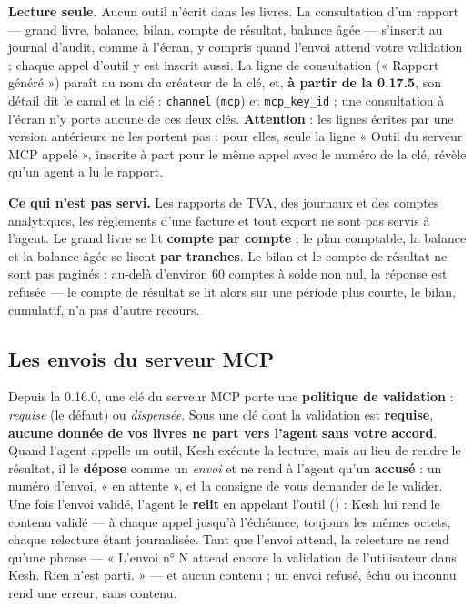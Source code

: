 \documentclass[a4paper,11pt,oneside]{article}
\begin{document}
\textbf{Lecture seule.} Aucun outil n'écrit dans les livres. La consultation d'un rapport --- grand livre, balance, bilan, compte de résultat, balance âgée --- s'inscrit au journal d'audit, comme à l'écran, y compris quand l'envoi attend votre validation ; chaque appel d'outil y est inscrit aussi. La ligne de consultation (« Rapport généré ») paraît au nom du créateur de la clé, et, \textbf{à partir de la 0.17.5}, son détail dit le canal et la clé : \texttt{channel} (\texttt{mcp}) et \texttt{mcp\_key\_id} ; une consultation à l'écran n'y porte aucune de ces deux clés. \textbf{Attention} : les lignes écrites par une version antérieure ne les portent pas : pour elles, seule la ligne « Outil du serveur MCP appelé », inscrite à part pour le même appel avec le numéro de la clé, révèle qu'un agent a lu le rapport.

\textbf{Ce qui n'est pas servi.} Les rapports de TVA, des journaux et des comptes analytiques, les règlements d'une facture et tout export ne sont pas servis à l'agent. Le grand livre se lit \textbf{compte par compte} ; le plan comptable, la balance et la balance âgée se lisent \textbf{par tranches}. Le bilan et le compte de résultat ne sont pas paginés : au-delà d'environ 60 comptes à solde non nul, la réponse est refusée --- le compte de résultat se lit alors sur une période plus courte, le bilan, cumulatif, n'a pas d'autre recours.

\subsection{Les envois du serveur MCP}\label{sec:mcp-envois}

Depuis la 0.16.0, une clé du serveur MCP porte une \textbf{politique de validation} : \emph{requise} (le défaut) ou \emph{dispensée}. Sous une clé dont la validation est \textbf{requise}, \textbf{aucune donnée de vos livres ne part vers l'agent sans votre accord}. Quand l'agent appelle un outil, Kesh exécute la lecture, mais au lieu de rendre le résultat, il le \textbf{dépose} comme un \emph{envoi} et ne rend à l'agent qu'un \textbf{accusé} : un numéro d'envoi, « en attente », et la consigne de vous demander de le valider. Une fois l'envoi validé, l'agent le \textbf{relit} en appelant l'outil  () : Kesh lui rend le contenu validé --- à chaque appel jusqu'à l'échéance, toujours les mêmes octets, chaque relecture étant journalisée. Tant que l'envoi attend, la relecture ne rend qu'une phrase --- « L'envoi n° N attend encore la validation de l'utilisateur dans Kesh. Rien n'est parti. » --- et aucun contenu ; un envoi refusé, échu ou inconnu rend une erreur, sans contenu.
\end{document}
